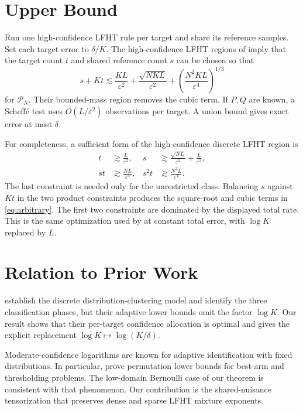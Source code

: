 \documentclass[twoside]{article}
\newcommand{\cP}{\mathcal P}
\begin{document}
\section{Upper Bound}

Run one high-confidence LFHT rule per target and share its reference samples. Set each target error to $\delta/K$. The high-confidence LFHT regions of \citet{gerber2023classification} imply that the target count $t$ and shared reference count $s$ can be chosen so that
\[
s+Kt\lesssim
\frac{KL}{\varepsilon^2}
+\frac{\sqrt{NKL}}{\varepsilon^2}
+\left(\frac{N^2KL}{\varepsilon^4}\right)^{1/3}
\]
for $\cP_N$. Their bounded-mass region removes the cubic term. If $P,Q$ are known, a Scheff\'e test uses $O(L/\varepsilon^2)$ observations per target. A union bound gives exact error at most $\delta$.

For completeness, a sufficient form of the high-confidence discrete LFHT region is
\[
\begin{aligned}
t&\gtrsim\frac{L}{\varepsilon^2},&
s&\gtrsim\frac{\sqrt{NL}}{\varepsilon^2}+\frac{L}{\varepsilon^2},\\
st&\gtrsim\frac{NL}{\varepsilon^4},&
s^2t&\gtrsim\frac{N^2L}{\varepsilon^4}.
\end{aligned}
\]
The last constraint is needed only for the unrestricted class. Balancing $s$ against $Kt$ in the two product constraints produces the square-root and cubic terms in \eqref{eq:arbitrary}. The first two constraints are dominated by the displayed total rate. This is the same optimization used by \citet{kumar2026clustering} at constant total error, with $\log K$ replaced by $L$.

\section{Relation to Prior Work}

\citet{kumar2026clustering} establish the discrete distribution-clustering model and identify the three classification phases, but their adaptive lower bounds omit the factor $\log K$. Our result shows that their per-target confidence allocation is optimal and gives the explicit replacement $\log K\mapsto\log(K/\delta)$.

Moderate-confidence logarithms are known for adaptive identification with fixed distributions. In particular, \citet{simchowitz2017simulator} prove permutation lower bounds for best-arm and thresholding problems. The low-domain Bernoulli case of our theorem is consistent with that phenomenon. Our contribution is the shared-nuisance tensorization that preserves dense and sparse LFHT mixture exponents.
\end{document}
